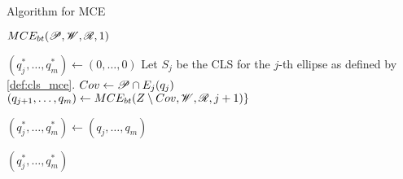\begin{algorithm}
	\caption{Algorithm for MCE}\label{algoritmo:mce}
	
	\begin{algorithmic}[1]
		
		
		\item[]
		\State \Return $MCE_{bt}(\mathscr{P}, \mathscr{W}, \mathscr{R}, 1)$
		\EndProcedure
		
		\item[]
		
		\State $(q_j^*, \dots, q_m^*) \gets (0, \dots, 0)$
		\State Let $S_j$ be the CLS for the $j$-th ellipse as defined by \autoref{def:cls_mce}.
			\State $Cov \gets \mathscr{P} \cap E_j(q_j)$
				\State $(q_{j+1}, \dots, q_m) \gets MCE_{bt}(Z \setminus Cov, \mathscr{W}, \mathscr{R}, j+1)\}$
			\EndIf
			
			\State $(q_j^*, \dots, q_m^*) \gets(q_j, \dots, q_m)$
			\EndIf
		\EndFor
		
		\State \Return $(q_j^*, \dots, q_m^*)$
		\EndProcedure
	\end{algorithmic}
\end{algorithm}